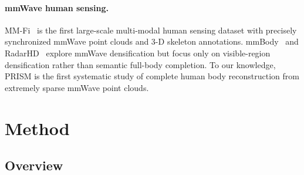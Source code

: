 \documentclass{article}
\begin{document}
\paragraph{mmWave human sensing.}
MM-Fi~\cite{yang2023mmfi} is the first large-scale multi-modal human sensing
dataset with precisely synchronized mmWave point clouds and 3-D skeleton
annotations.
mmBody~\cite{mmbody} and RadarHD~\cite{radarhd} explore mmWave densification
but focus only on visible-region densification rather than semantic full-body
completion.
To our knowledge, PRISM is the first systematic study of complete human body
reconstruction from extremely sparse mmWave point clouds.

\section{Method}
\label{sec:method}

\subsection{Overview}
\end{document}
